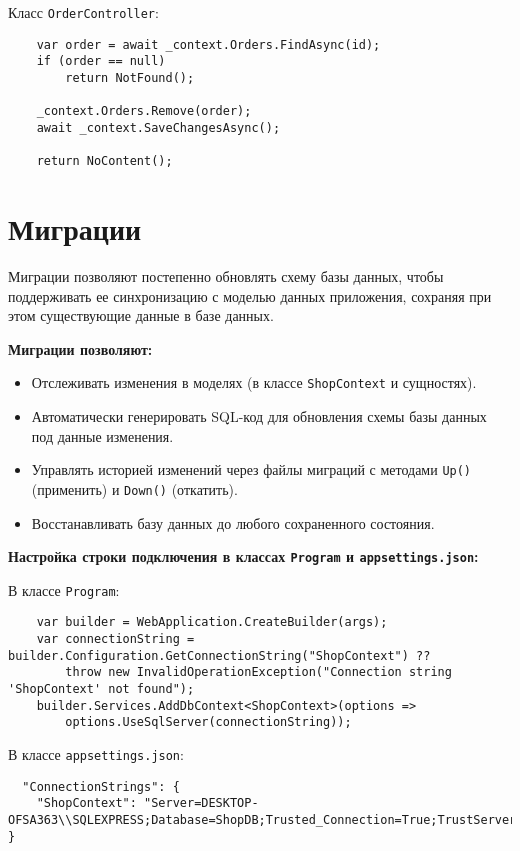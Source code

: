 \documentclass[a4paper,12pt]{report}
\begin{document}
Класс \texttt{OrderController}:
\begin{verbatim}
    var order = await _context.Orders.FindAsync(id);
    if (order == null)
        return NotFound();

    _context.Orders.Remove(order);
    await _context.SaveChangesAsync();

    return NoContent();
\end{verbatim}

    
\section{Миграции}

Миграции позволяют постепенно обновлять схему базы данных, чтобы поддерживать ее синхронизацию 
с моделью данных приложения, сохраняя при этом существующие данные в базе данных.\cite{migration}

\textbf{Миграции позволяют:}
\begin{itemize}
    \item
        Отслеживать изменения в моделях (в классе \texttt{ShopContext} и сущностях).
    \item
        Автоматически генерировать \acs{SQL}-код для обновления схемы базы данных под данные изменения.
    \item
        Управлять историей изменений через файлы миграций с методами \texttt{Up()} (применить) и \texttt{Down()} (откатить).
    \item
        Восстанавливать базу данных до любого сохраненного состояния.
\end{itemize}

\textbf{Настройка строки подключения в классах \texttt{Program} и \texttt{appsettings.json}:}

В классе \texttt{Program}:
\begin{verbatim}
    var builder = WebApplication.CreateBuilder(args);
    var connectionString = builder.Configuration.GetConnectionString("ShopContext") ??
        throw new InvalidOperationException("Connection string 'ShopContext' not found");
    builder.Services.AddDbContext<ShopContext>(options =>
        options.UseSqlServer(connectionString));
\end{verbatim}

В классе \texttt{appsettings.json}:
\begin{verbatim}
  "ConnectionStrings": {
    "ShopContext": "Server=DESKTOP-OFSA363\\SQLEXPRESS;Database=ShopDB;Trusted_Connection=True;TrustServerCertificate=True;"
}
\end{verbatim}
\end{document}
